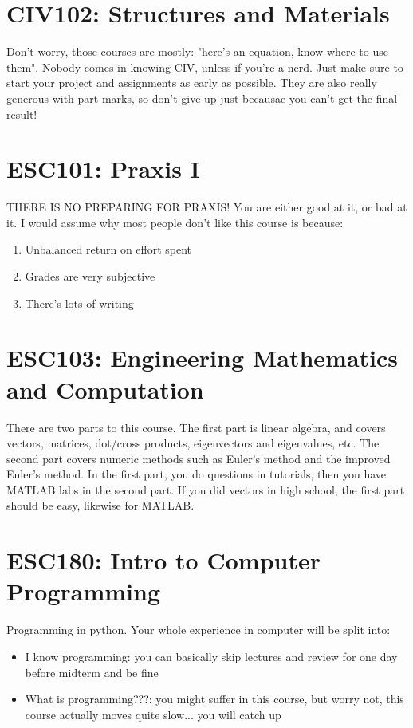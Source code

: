 \section{CIV102: Structures and Materials}

Don't worry, those courses are mostly: "here's an equation, know where to use them". Nobody comes in knowing CIV, unless if you're a nerd. Just make sure to start your project and assignments as early as possible. They are also really generous with part marks, so don't give up just becausae you can't get the final result!

\section{ESC101: Praxis I}

THERE IS NO PREPARING FOR PRAXIS! You are either good at it, or bad at it. I would assume why most people don't like this course is because:

\begin{enumerate}
    \item Unbalanced return on effort spent
    \item Grades are very subjective
    \item There's lots of writing
\end{enumerate}

\section{ESC103: Engineering Mathematics and Computation}

There are two parts to this course. The first part is linear algebra, and covers vectors, matrices, dot/cross products, eigenvectors and eigenvalues, etc. The second part covers numeric methods such as Euler's method and the improved Euler's method. In the first part, you do questions in tutorials, then you have MATLAB labs in the second part. If you did vectors in high school, the first part should be easy, likewise for MATLAB.

\section{ESC180: Intro to Computer Programming}

Programming in python. Your whole experience in computer will be split into:

\begin{itemize}
    \item I know programming: you can basically skip lectures and review for one day before midterm and be fine
    \item What is programming???: you might suffer in this course, but worry not, this course actually moves quite slow... you will catch up
\end{itemize}

